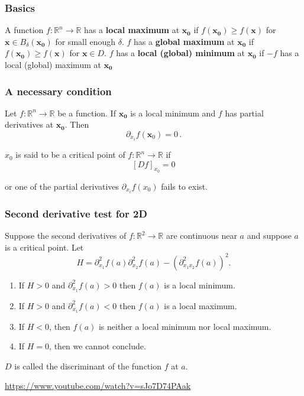 \documentclass[aspectratio=169]{beamer}
\newcommand{\R}{\mathbb{R}}
\begin{document}
\begin{frame}
    \frametitle{Basics}
\begin{definition}
A function \(f:\R^n \to \mathbb{R}\) has a \textbf{local maximum} at \(\mathbf{x_0}\) if
\(f(\mathbf{x_0}) \geq f(\mathbf{x})\) for \(\mathbf{x} \in B_\delta(\mathbf{x_0})\) for small enough \(\delta\).
\(f\) has a \textbf{global maximum} at \(\mathbf{x_0}\) if
\(f(\mathbf{x_0}) \geq f(\mathbf{x})\) for \(\mathbf{x} \in D\).
\(f\) has a \textbf{local (global) minimum} at \(\mathbf{x_0}\) if
\(-f\) has a local (global) maximum at \(\mathbf{x_0}\)
\end{definition}

\end{frame}


\begin{frame}
    \frametitle{A necessary condition}
\begin{theorem}
Let \(f:\R^n \to \mathbb{R}\) be a function.
If \(\mathbf{x_0}\) is a local minimum and \(f\) has partial derivatives at \(\mathbf{x_0}\).
Then
\begin{equation*}
    \partial_{x_i} f(\mathbf{x}_0) = 0 \,.
\end{equation*}
\end{theorem}
\end{frame}

\begin{frame}
    \begin{definition}
        $x_0$ is said to be a critical point of $f: \R^n \to \R$ if
        $$[D f]_{x_0} = 0$$
    \end{definition}
    or one of the partial derivatives $\partial_{x_i} f(x_0)$ fails to exist.
\end{frame}

\begin{frame}
    \frametitle{Second derivative test for 2D}
    Suppose the second derivatives of $f:\R^2 \to \R$ are continuous near $a$ and
    suppose $a$ is a critical point. Let
    $$ H = \partial_{x_1}^2 f(a)\partial_{x_2}^2 f(a) - (\partial_{x_1 x_2}^2 f (a))^2. $$
    \begin{enumerate}
        \item If $H>0$ and $\partial_{x_1}^2 f(a) > 0$ then $f(a)$ is a local minimum.
        \item If $H>0$ and $\partial_{x_1}^2 f(a) < 0$ then $f(a)$ is a local maximum.
        \item If $H<0$, then $f(a)$ is neither a local minimum nor local maximum.
        \item If $H = 0$, then we cannot conclude.
    \end{enumerate}
    $D$ is called the discriminant of the function $f$ at $a$.

    \url{https://www.youtube.com/watch?v=sJo7D74PAak}
\end{frame}
\end{document}
